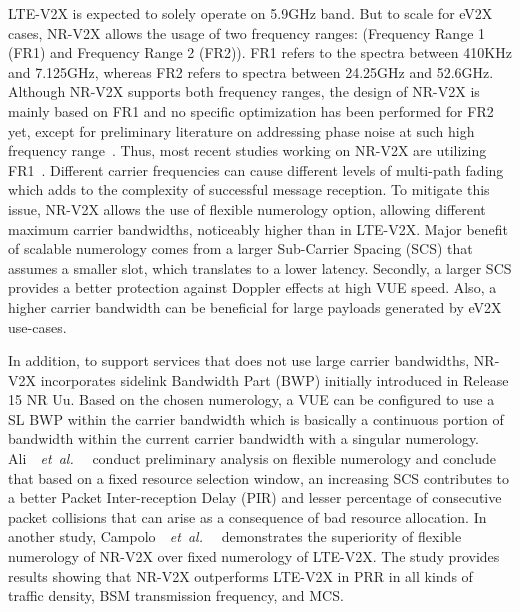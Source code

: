 \documentclass[iicol]{sn-jnl}%
\theoremstyle{thmstyleone}%
\theoremstyle{thmstyletwo}%
\theoremstyle{thmstylethree}%
\def\etal{\emph{~et~al. }}
\begin{document}
LTE-V2X is expected to solely operate on 5.9GHz band. But to scale for eV2X cases, NR-V2X allows the usage of two frequency ranges: (Frequency Range 1 (FR1) and Frequency Range 2 (FR2)). FR1 refers to the spectra between 410KHz and 7.125GHz, whereas FR2 refers to spectra between 24.25GHz and 52.6GHz. 
Although NR-V2X supports both frequency ranges, the design of NR-V2X is mainly based on FR1 and no specific optimization has been performed for FR2 yet, except for preliminary literature on addressing phase noise at such high frequency range\mbox{~\cite{zou2016impact}}. 
Thus, most recent studies working on NR-V2X are utilizing FR1\mbox{~\cite{saad2021advancements,ali2021impact,ali20213gpp}}.
Different carrier frequencies can cause different levels of multi-path fading which adds to the complexity of successful message reception. To mitigate this issue, NR-V2X allows the use of flexible numerology option, allowing different maximum carrier bandwidths, noticeably higher than in LTE-V2X. Major benefit of scalable numerology comes from a larger Sub-Carrier Spacing (SCS) that assumes a smaller slot, which translates to a lower latency. Secondly, a larger SCS provides a better protection against Doppler effects at high VUE speed. Also, a higher carrier bandwidth can be beneficial for large payloads generated by eV2X use-cases.

In addition, to support services that does not use large carrier bandwidths, NR-V2X incorporates sidelink Bandwidth Part (BWP) initially introduced in Release 15 NR Uu. Based on the chosen numerology, a VUE can be configured to use a SL BWP within the carrier bandwidth which is basically a continuous portion of bandwidth within the current carrier bandwidth with a singular numerology. 
Ali\mbox{~\etal~\cite{ali2021impact,ali20213gpp}} conduct preliminary analysis on flexible numerology and conclude that based on a fixed resource selection window, an increasing SCS contributes to a better Packet Inter-reception Delay (PIR) and lesser percentage of consecutive packet collisions that can arise as a consequence of bad resource allocation.
In another study, Campolo\mbox{~\etal~\cite{campolo20195g}} demonstrates the superiority of flexible numerology of NR-V2X over fixed numerology of LTE-V2X. The study provides results showing that NR-V2X outperforms LTE-V2X in PRR in all kinds of traffic density, BSM transmission frequency, and MCS.
\end{document}
